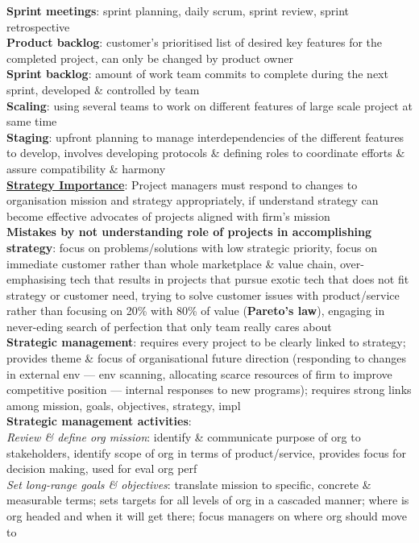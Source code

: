 \documentclass[a4paper]{article}
\begin{document}
\begin{multicols}{2}
        \textbf{Sprint meetings}: sprint planning, daily scrum, sprint review, sprint retrospective\\
        \textbf{Product backlog}: customer's prioritised list of desired key features for the completed project, can only be changed by product owner\\
        \textbf{Sprint backlog}: amount of work team commits to complete during the next sprint, developed \& controlled by team\\
        \textbf{Scaling}: using several teams to work on different features of large scale project at same time\\
        \textbf{Staging}: upfront planning to manage interdependencies of the different features to develop, involves developing protocols \& defining roles to coordinate efforts \& assure compatibility \& harmony\\
        \underline{\textbf{Strategy Importance}}: Project managers must respond to changes to organisation mission and strategy appropriately, if understand strategy can become effective advocates of projects aligned with firm's mission\\
        \textbf{Mistakes by not understanding role of projects in accomplishing strategy}: focus on problems/solutions with low strategic priority, focus on immediate customer rather than whole marketplace \& value chain, over-emphasising tech that results in projects that pursue exotic tech that does not fit strategy or customer need, trying to solve customer issues with product/service rather than focusing on 20\% with 80\% of value (\textbf{Pareto's law}), engaging in never-eding search of perfection that only team really cares about\\
        \textbf{Strategic management}: requires every project to be clearly linked to strategy; provides theme \& focus of organisational future direction (responding to changes in external env --- env scanning, allocating scarce resources of firm to improve competitive position --- internal responses to new programs); requires strong links among mission, goals, objectives, strategy, impl\\
        \textbf{Strategic management activities}:\\
        \textit{Review \& define org mission}: identify \& communicate purpose of org to stakeholders, identify scope of org in terms of product/service, provides focus for decision making, used for eval org perf\\
        \textit{Set long-range goals \& objectives}: translate mission to specific, concrete \& measurable terms; sets targets for all levels of org in a cascaded manner; where is org headed and when it will get there; focus managers on where org should move to\\

\end{multicols}
\end{document}
